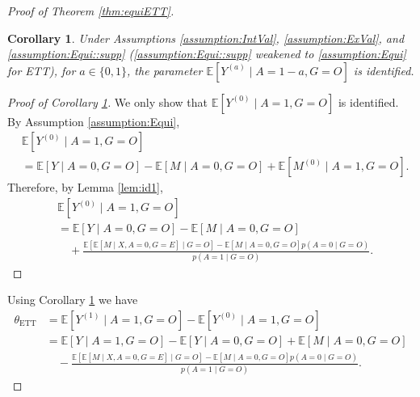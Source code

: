 \documentclass[10pt]{article}
\newtheorem{corollary}{Corollary}
\newcommand{\E}{\mathbb{E}}
\begin{document}
\begin{proof}[Proof of Theorem \ref{thm:equiETT}]
\begin{corollary}
\label{cor:id1}
Under Assumptions \ref{assumption:IntVal}, \ref{assumption:ExVal}, and \ref{assumption:Equi::supp} (\ref{assumption:Equi::supp} weakened to \ref{assumption:Equi} for ETT), for $a\in\{0,1\}$, the parameter $\E[Y^{(a)}\mid A=1-a,G=O]$ is identified. 
\end{corollary}
\begin{proof}[Proof of Corollary \ref{cor:id1}]
We only show that $\E[Y^{(0)}\mid A=1,G=O]$ is identified.
By Assumption \ref{assumption:Equi},
\begin{align*}
&\E[Y^{(0)}\mid  A=1,G=O]\\
&=\E[Y\mid  A=0,G=O]
-\E[M\mid A=0,G=O]+\E[M^{(0)}\mid A=1,G=O].
\end{align*}
Therefore, by Lemma \ref{lem:id1}, 
\begin{align*}
&\E[Y^{(0)}\mid  A=1,G=O]\\
&=\E[Y\mid  A=0,G=O]
-\E[M\mid A=0,G=O]\\
&\quad+\frac{\E[\E[M\mid X,A=0,G=E]\mid G=O]-\E[M\mid A=0, G=O]p(A=0\mid G=O)}{p(A=1\mid G=O)}.
\end{align*}

\end{proof}

Using Corollary \ref{cor:id1} we have
\begin{align*}
\theta_{\text{ETT}}&=\E[Y^{(1)}\mid A=1, G=O]-\E[Y^{(0)}\mid A=1, G=O]\\
&=\E[Y\mid A=1, G=O]-\E[Y\mid  A=0,G=O]
+\E[M\mid A=0,G=O]\\
&\quad-\frac{\E[\E[M\mid X,A=0,G=E]\mid G=O]-\E[M\mid A=0, G=O]p(A=0\mid G=O)}{p(A=1\mid G=O)}.
\end{align*}

\end{proof}
\end{document}
